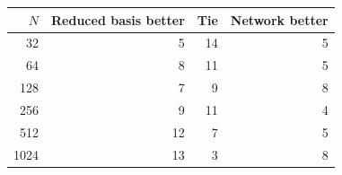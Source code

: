 \begin{tabular}{rrrr}
\toprule
$N$ & Reduced basis better & Tie & Network better \\
\midrule
32 & 5 & 14 & 5 \\
64 & 8 & 11 & 5 \\
128 & 7 & 9 & 8 \\
256 & 9 & 11 & 4 \\
512 & 12 & 7 & 5 \\
1024 & 13 & 3 & 8 \\
\bottomrule
\end{tabular}
